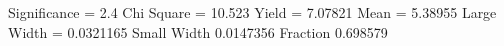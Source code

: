 Significance = 2.4
Chi Square = 10.523
Yield = 7.07821
Mean = 5.38955
Large Width = 0.0321165
Small Width 0.0147356
Fraction 0.698579
